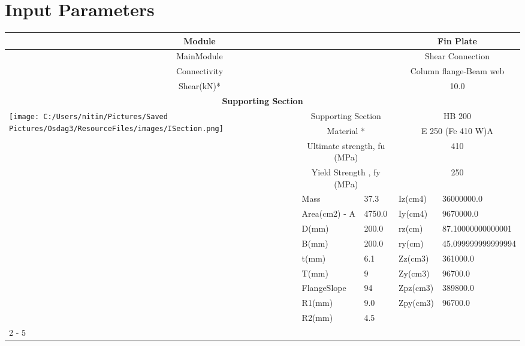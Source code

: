\documentclass{article}%
\begin{document}
%
\normalsize%
\pagestyle{header}%
\section{Input Parameters}%
\label{sec:InputParameters}%
\renewcommand{\arraystretch}{1.2}%
\begin{longtable}{|p{5cm}|p{2cm}|p{2cm}|p{2cm}|p{5cm}|}%
\hline%
\hline%
\multicolumn{3}{|c|}{Module}&\multicolumn{2}{|c|}{Fin Plate}\\%
\hline%
\hline%
\multicolumn{3}{|c|}{MainModule}&\multicolumn{2}{|c|}{Shear Connection}\\%
\hline%
\hline%
\multicolumn{3}{|c|}{Connectivity}&\multicolumn{2}{|c|}{Column flange{-}Beam web}\\%
\hline%
\hline%
\multicolumn{3}{|c|}{Shear(kN)*}&\multicolumn{2}{|c|}{10.0}\\%
\hline%
\hline%
\multicolumn{5}{|c|}{\textbf{Supporting Section}}\\%
\hline%
\hline%
\multirow{13}{*}{\texttt{[image: C:/Users/nitin/Pictures/Saved Pictures/Osdag3/ResourceFiles/images/ISection.png]}}&\multicolumn{2}{|c|}{Supporting Section}&\multicolumn{2}{|c|}{HB 200}\\%
\cline{2%
-%
5}%
&\multicolumn{2}{|c|}{Material *}&\multicolumn{2}{|c|}{E 250 (Fe 410 W)A}\\%
\cline{2%
-%
5}%
&\multicolumn{2}{|c|}{Ultimate strength, fu (MPa)}&\multicolumn{2}{|c|}{410}\\%
\cline{2%
-%
5}%
&\multicolumn{2}{|c|}{Yield Strength , fy (MPa)}&\multicolumn{2}{|c|}{250}\\%
\cline{2%
-%
5}%
&Mass&37.3&Iz(cm4)&36000000.0\\%
\cline{2%
-%
5}%
&Area(cm2) {-} A&4750.0&Iy(cm4)&9670000.0\\%
\cline{2%
-%
5}%
&D(mm)&200.0&rz(cm)&87.10000000000001\\%
\cline{2%
-%
5}%
&B(mm)&200.0&ry(cm)&45.099999999999994\\%
\cline{2%
-%
5}%
&t(mm)&6.1&Zz(cm3)&361000.0\\%
\cline{2%
-%
5}%
&T(mm)&9&Zy(cm3)&96700.0\\%
\cline{2%
-%
5}%
&FlangeSlope&94&Zpz(cm3)&389800.0\\%
\cline{2%
-%
5}%
&R1(mm)&9.0&Zpy(cm3)&96700.0\\%
\cline{2%
-%
5}%
&R2(mm)&4.5&&\\%
\cline{2%
-%
5}%
\hline%
\multicolumn{5}{|c|}{\textbf{Supported Section}}\\%

\end{longtable}
\end{document}
